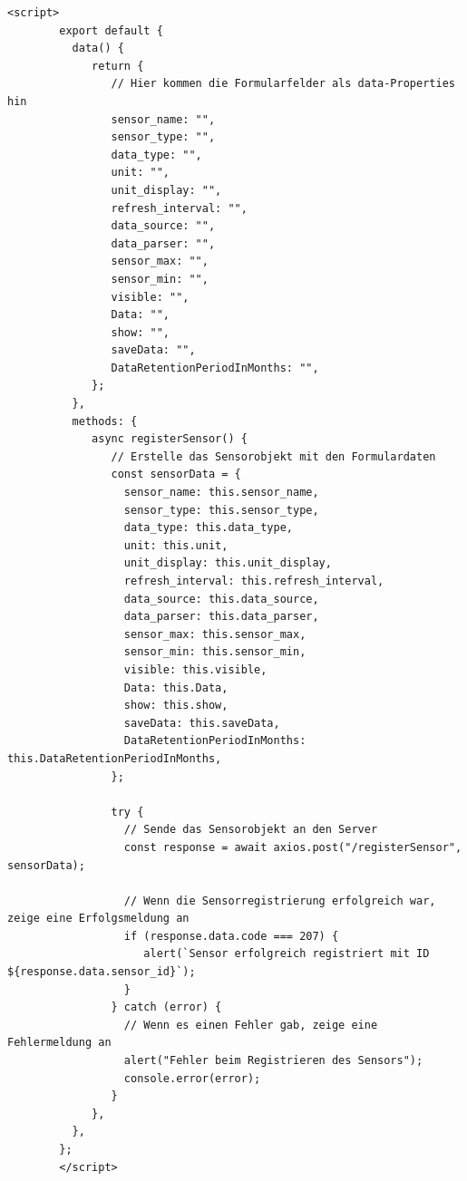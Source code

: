 \begin{lstlisting}[caption={registerSensor (Frontend)}, style=js]
		<script>
		export default {
		  data() {
			 return {
				// Hier kommen die Formularfelder als data-Properties hin
				sensor_name: "",
				sensor_type: "",
				data_type: "",
				unit: "",
				unit_display: "",
				refresh_interval: "",
				data_source: "",
				data_parser: "",
				sensor_max: "",
				sensor_min: "",
				visible: "",
				Data: "",
				show: "",
				saveData: "",
				DataRetentionPeriodInMonths: "",
			 };
		  },
		  methods: {
			 async registerSensor() {
				// Erstelle das Sensorobjekt mit den Formulardaten
				const sensorData = {
				  sensor_name: this.sensor_name,
				  sensor_type: this.sensor_type,
				  data_type: this.data_type,
				  unit: this.unit,
				  unit_display: this.unit_display,
				  refresh_interval: this.refresh_interval,
				  data_source: this.data_source,
				  data_parser: this.data_parser,
				  sensor_max: this.sensor_max,
				  sensor_min: this.sensor_min,
				  visible: this.visible,
				  Data: this.Data,
				  show: this.show,
				  saveData: this.saveData,
				  DataRetentionPeriodInMonths: this.DataRetentionPeriodInMonths,
				};

				try {
				  // Sende das Sensorobjekt an den Server
				  const response = await axios.post("/registerSensor", sensorData);

				  // Wenn die Sensorregistrierung erfolgreich war, zeige eine Erfolgsmeldung an
				  if (response.data.code === 207) {
					 alert(`Sensor erfolgreich registriert mit ID ${response.data.sensor_id}`);
				  }
				} catch (error) {
				  // Wenn es einen Fehler gab, zeige eine Fehlermeldung an
				  alert("Fehler beim Registrieren des Sensors");
				  console.error(error);
				}
			 },
		  },
		};
		</script>
	\end{lstlisting}


